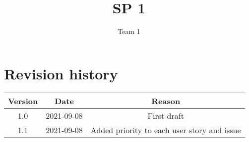 \documentclass{article}
\title{SP 1}
\author{Team 1}
\begin{document}
\date{}
\maketitle
\thispagestyle{fancy}

\section*{Revision history}
\begin{tabular}{ |c|c|c| } 
 \hline
 Version & Date & Reason \\ \hline
 1.0 & 2021-09-08 & First draft \\ 
 1.1 & 2021-09-08 & Added priority to each user story and issue \\ 
 \hline
\end{tabular}

\newpage
\end{document}
